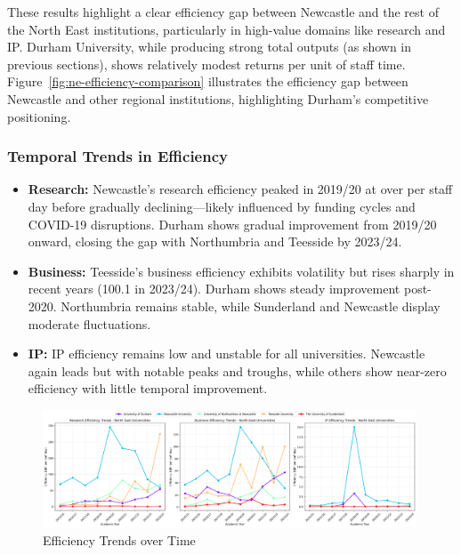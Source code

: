 \documentclass[journal,onecolumn, 10pt,draftclsnofoot]{IEEEtran}
\begin{document}
These results highlight a clear efficiency gap between Newcastle and the rest of the North East institutions, particularly in high-value domains like research and IP. Durham University, while producing strong total outputs (as shown in previous sections), shows relatively modest returns per unit of staff time. Figure~\ref{fig:ne-efficiency-comparison} illustrates the efficiency gap between Newcastle and other regional institutions, highlighting Durham's competitive positioning.

\subsubsection{Temporal Trends in Efficiency}

\begin{itemize}
    \item \textbf{Research:} Newcastle's research efficiency peaked in 2019/20 at over  per staff day before gradually declining—likely influenced by funding cycles and COVID-19 disruptions. Durham shows gradual improvement from 2019/20 onward, closing the gap with Northumbria and Teesside by 2023/24.
    
    \item \textbf{Business:} Teesside's business efficiency exhibits volatility but rises sharply in recent years (100.1 in 2023/24). Durham shows steady improvement post-2020. Northumbria remains stable, while Sunderland and Newcastle display moderate fluctuations.
    
    \item \textbf{IP:} IP efficiency remains low and unstable for all universities. Newcastle again leads but with notable peaks and troughs, while others show near-zero efficiency with little temporal improvement.
\end{itemize}

\begin{figure}[h]
\centering
\includegraphics[width=0.99\textwidth]{Fig/figure39.efficiency_trends.png}
\caption{Efficiency Trends over Time}
\label{fig:efficiency-trends}
\end{figure}
\end{document}
